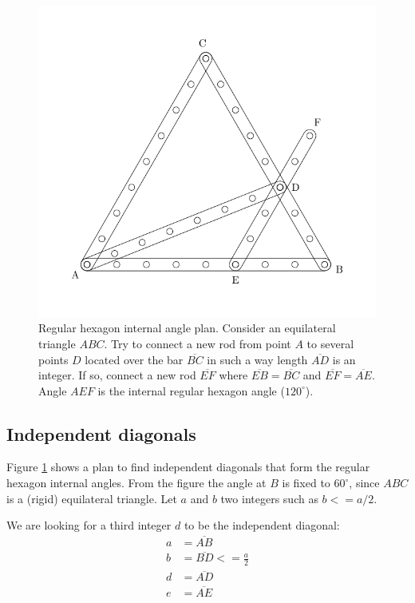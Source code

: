 \documentclass[11pt]{article}
\begin{document}
\begin{figure}[htpb]
\centering
\includegraphics[scale=0.8]{hexagon_angle}
\caption{Regular hexagon internal angle plan. Consider an equilateral triangle $ABC$.
Try to connect a new rod from point $A$ to several points $D$ located 
over the bar $\overline{BC}$
in such a way length $\overline{AD}$ is an integer.
If so, connect a new rod $\overline{EF}$ where $\overline{EB} = \overline{BC}$ and $\overline{EF} = \overline{AE}$. Angle $AEF$ is the internal regular hexagon angle ($120^\circ{}$).}
\label{fig:plan}
\end{figure}

\subsection{Independent diagonals}

Figure \ref{fig:plan} shows a plan to find independent diagonals that form the regular hexagon internal angles.
From the figure the angle at $B$ is fixed to $60^\circ{}$, since $ABC$ is a
(rigid) equilateral triangle.
Let $a$ and $b$ two integers such as $b <= a/2$.

We are looking for a third integer $d$ to be the independent diagonal:
\begin{align*}
a &= \overline{AB}\\
b &= \overline{BD} <= \frac{a}{2}\\
d &= \overline{AD}\\
e &= \overline{AE}
\end{align*}
\end{document}
